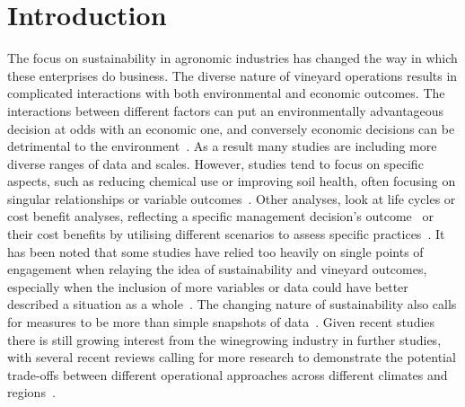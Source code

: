 \documentclass[10pt,letterpaper]{article}
\begin{document}
\linenumbers

\section*{Introduction}

The focus on sustainability in agronomic industries has changed the way in which these enterprises do business. The diverse nature of vineyard operations results in complicated interactions with both environmental and economic outcomes. The interactions between different factors can put an environmentally advantageous decision at odds with an economic one, and conversely economic decisions can be detrimental to the environment~\cite{beaumelleBiodiversityConservationEcosystem2023}. As a result many studies are including more diverse ranges of data and scales. However, studies tend to focus on specific aspects, such as reducing chemical use or improving soil health, often focusing on singular relationships or variable outcomes~\cite{barriguinhaVineyardYieldEstimation2021,heFruitYieldPrediction2022,laurentReviewIssuesMethods2021}. Other analyses, look at life cycles or cost benefit analyses, reflecting a specific management decision's outcome~\cite{abbottAWRIAssessingEnvironmental2016,beauchetInterannualVariabilityEnvironmental2019,ferraraLifeCycleAssessment2018} or their cost benefits by utilising different scenarios to assess specific practices~\cite{fincoCombiningPrecisionViticulture2022a,singhBibliometricReviewUse2022}. It has been noted that some studies have relied too heavily on single points of engagement when relaying the idea of sustainability and vineyard outcomes, especially when the inclusion of more variables or data could have better described a situation as a whole~\cite{baianoOverviewSustainabilityWine2021,santiago-brownSustainabilityAssessmentWineGrape2015}. The changing nature of sustainability also calls for measures to be more than simple snapshots of data~\cite{baianoOverviewSustainabilityWine2021,montalvo-falconSustainabilityResearchWine2023,santiago-brownSustainabilityAssessmentWineGrape2015}. Given recent studies there is still growing interest from the winegrowing industry in further studies, with several recent reviews calling for more research to demonstrate the potential trade-offs between different operational approaches across different climates and regions~\cite{baianoOverviewSustainabilityWine2021,marianiSustainableWinegrowingCurrent2015,montalvo-falconSustainabilityResearchWine2023}.
\end{document}
